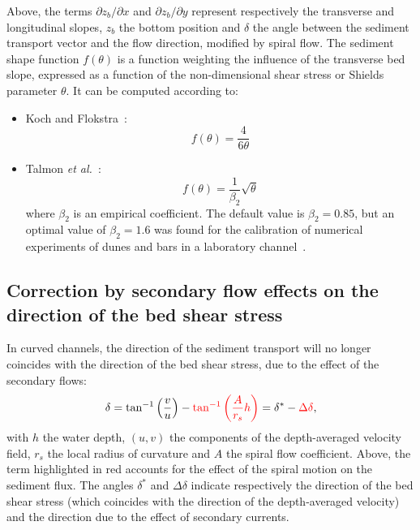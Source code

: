 Above, the terms $\partial z_b/\partial x$ and $\partial z_b/\partial y$ represent respectively the transverse and longitudinal slopes, $z_b$ the bottom position and $\delta$ the angle between the sediment transport vector and the flow direction, modified by spiral flow. The sediment shape function $f(\theta)$ is a function weighting the influence of the transverse bed slope, expressed as a function of the non-dimensional shear stress or Shields parameter $\theta$. It can be computed according to:

\begin{itemize}
\item Koch and Flokstra~\cite{KochFlokstra80}:
\begin{equation*}
f(\theta) = \frac{4}{6\theta}
\end{equation*}
\item Talmon \textit{et al.}~\cite{Talmon95}:
\begin{equation*}
f(\theta) = \frac{1}{\beta_2}\sqrt{\theta}
\end{equation*}
where $\beta_2$ is an empirical coefficient. The default value is $\beta_2=0.85$, but an optimal value of $\beta_2=1.6$ was found for the calibration of numerical experiments of dunes and bars in a laboratory channel~\cite{Mendoza15}.
\end{itemize}

\subsection{Correction by secondary flow effects on the direction of the bed shear stress}
In curved channels, the direction of the sediment transport will no longer coincides with the direction of the bed shear stress,
due to the effect of the secondary flows:
\begin{equation}\label{eq:delta}
\delta = \tan^{-1}\left(\frac{v}{u}\right) - \textcolor{red}{\tan^{-1}\left(\frac{A}{r_s}h\right)} = \delta^* - \textcolor{red}{\Delta\delta},
\end{equation}
with $h$ the water depth, $(u,v)$ the components of the depth-averaged velocity field, $r_s$ the local radius of curvature and $A$ the spiral flow coefficient. Above, the term highlighted in red accounts for the effect of the spiral motion on the sediment flux. The angles $\delta^*$ and $\Delta\delta$ indicate respectively the direction of the bed shear stress (which coincides with the direction of the depth-averaged velocity) and the direction due to the effect of secondary currents.

